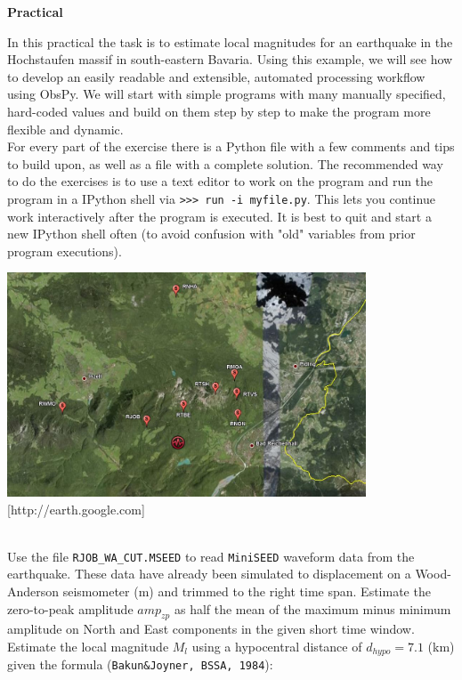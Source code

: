 \documentclass{LMUexercise}
\begin{document}
%
%
%
\vspace*{1cm}
\begin{center}
\textbf{\Large Practical}
\end{center}
%
%
In this practical the task is to estimate local magnitudes for an earthquake in
the Hochstaufen massif in south-eastern Bavaria. Using this example, we will
see how to develop an easily readable and extensible, automated processing
workflow using ObsPy. We will start with simple programs with many manually
specified, hard-coded values and build on them step by step to make the program
more flexible and dynamic.\\
For every part of the exercise there is a Python file with a few comments and
tips to build upon, as well as a file with a complete solution. The recommended
way to do the exercises is to use a text editor to work on the program and run
the program in a IPython shell via \verb#>>> run -i myfile.py#. This lets you
continue work interactively after the program is executed. It is best to quit
and start a new IPython shell often (to avoid confusion with "old" variables
from prior program executions).
\vspace*{2.0em}

\begin{center}
\includegraphics[width=0.8\textwidth]{rh.jpg}
\\[-1ex]{\tiny [http://earth.google.com]}
\end{center}
\vspace*{2.0em}

\\
Use the file \verb#RJOB_WA_CUT.MSEED# to read \verb#MiniSEED# waveform data
from the earthquake. These data have already been simulated to displacement on
a Wood-Anderson seismometer (m) and trimmed to the right time span. Estimate
the zero-to-peak amplitude $amp_{zp}$ as half the mean of the maximum minus
minimum amplitude on North and East components in the given short time window.
Estimate the local magnitude $M_l$ using a hypocentral distance of
$d_{hypo}=7.1$ (km) given the formula (\verb#Bakun&Joyner, BSSA, 1984#):
\end{document}
